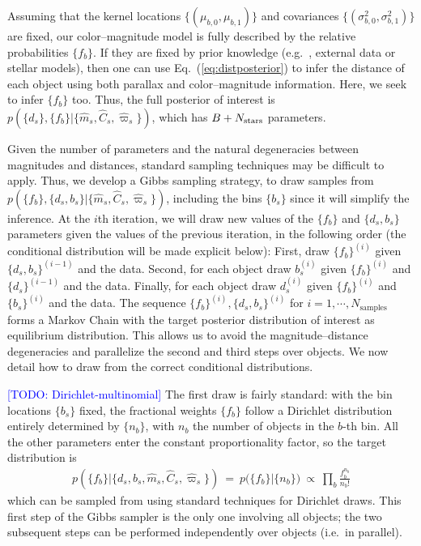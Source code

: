 \documentclass[manuscript, letterpaper]{aastex6}
\makeatletter
\let\origsubsection\subsection
\renewcommand\subsection{\@ifstar{\starsubsection}{\nostarsubsection}}
\newcommand\nostarsubsection[1]{\subsectionprelude\origsubsection{#1}}
\newcommand\starsubsection[1]{\subsectionprelude\origsubsection*{#1}}
\newcommand\subsectionprelude{\vspace{1em}}
\newcommand{\ie}{{{i.e.}~}}
\newcommand{\eg}{{{e.g.}~}}
\newcommand{\equref}[1]{{\xspace}Eq.~(\ref{#1})}
\newcommand{\eqn}[1]{\begin{eqnarray}#1\end{eqnarray}}
\newcommand{\nobj}{{N_{\rm stars}}}
\newcommand{\todo}[1]{\textcolor{blue}{[TODO: #1]}}
\makeatother
\begin{document}
\subsection{Inference}

Assuming that the kernel locations $\{  (\mu_{b,0}, \mu_{b,1}) \}$ and covariances $\{(\sigma_{b,0}^2, \sigma_{b,1}^2)\}$ are fixed, our color--magnitude model is fully described by the relative probabilities $\{ f_{b} \}$. 
If they are fixed by prior knowledge (\eg, external data or stellar models), then one can use \equref{eq:distposterior} to infer the distance of each object using both parallax and color--magnitude information.
Here, we seek to infer $\{ f_{b} \}$ too.
Thus, the full posterior of interest is $p(\{ d_s \}, \{ f_{b} \} | \{ \hat{m}_s, \hat{C}_s, \hat{\varpi}_s \})$, which has $B + \nobj$ parameters.

Given the number of parameters and the natural degeneracies between magnitudes and distances, standard sampling techniques may be difficult to apply.
Thus, we develop a Gibbs sampling strategy, to draw samples from $p(\{ f_{b} \},\{d_s, b_s\}  \rvert \{\hat{m}_s, \hat{C}_s, \hat{\varpi}_s\})$, including the bins $\{ b_s\}$ since it will simplify the inference. 
At the $i$th iteration, we will draw new values of the $\{ f_{b} \}$ and $\{d_s, b_s\}$ parameters given the values of the previous iteration, in the following order (the conditional distribution will be made explicit below):
First, draw $\{ f_{b} \}^{(i)}$ given $\{d_s, b_s\}^{(i-1)}$ and the data. 
Second, for each object draw $b_s^{(i)}$ given $\{ f_{b} \}^{(i)}$ and $\{d_s\}^{(i-1)}$ and the data. 
Finally, for each object draw $d_s^{(i)}$ given $\{ f_{b} \}^{(i)}$ and $\{b_s\}^{(i)}$ and the data.
The sequence $\{ f_{b} \}^{(i)},\{d_s, b_s\}^{(i)}$ for $i=1, \cdots, N_\mathrm{samples}$ forms a Markov Chain with the target posterior distribution of interest as equilibrium distribution.
This allows us to avoid the magnitude--distance degeneracies and parallelize the second and third steps over objects.
We now detail how to draw from the correct conditional distributions.

\todo{Dirichlet-multinomial}
The first draw is fairly standard: with the bin locations $\{b_s\}$ fixed, the fractional weights $\{ f_{b} \}$ follow a Dirichlet distribution entirely determined by $\{n_b \}$, with $n_b$ the number of objects in the $b$-th bin.
All the other parameters enter the constant proportionality factor, so the target distribution is
\eqn{
	p\left(\bigl\{ f_b \bigr\} \bigr\rvert \bigl\{ d_s, b_s, \hat{m}_s, \hat{C}_s, \hat{\varpi}_s \bigr\} \right) \ = \ p\bigl( \bigl\{ f_b \bigr\} \bigr\rvert \{n_b \} \bigr) \ \propto\  \prod_b \frac{ f_b^{n_b} }{n_b !}
}
which can be sampled from using standard techniques for Dirichlet draws.
This first step of the Gibbs sampler is the only one involving all objects; the two subsequent steps can be performed independently over objects (\ie in parallel).
\end{document}
